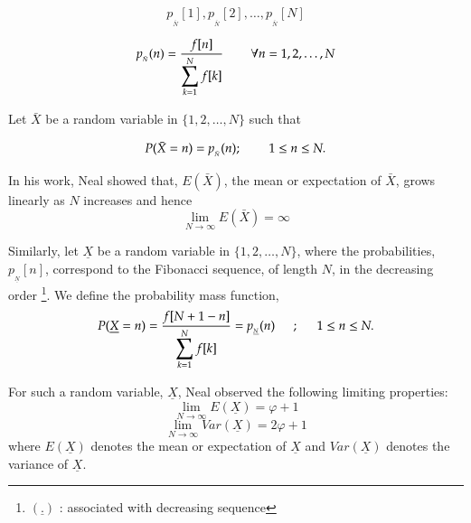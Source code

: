\begin{multicols}{2}
\vspace{-.6cm}

$$
p_{_{\bar{N}}}[1], p_{_{\bar{N}}}[2], \ldots, p_{_{\bar{N}}}[N]
$$

\vspace{-.2cm}

\begin{equation}
 p_{_{\bar{N}}}(n) = \frac{f[n]}{\displaystyle{\sum_{k =1}^N f[k]}} \hspace{0.3in} \forall n = 1, 2, \ldots, N \label{eq-2.3}
 \end{equation}

\vspace{-.2cm}

Let $\bar{X}$ be a random variable in $\{1,2, \ldots, N\}$ such that  

\vspace{-.2cm} 
 
\begin{equation}
P(\bar{X} = n) = p_{_{\bar{N}}}(n); \hspace{0.3in} 1 \leq n\leq N.\label{eq-2.4}
\end{equation}
 
\vspace{-.2cm} 
 
In his work, Neal \cite{art1-key01} showed that, $E(\bar{X})$, the mean or expectation of $\bar{X}$, grows linearly as $N$ increases and hence 
\begin{equation}
\lim_{N\rightarrow \infty} E(\bar{X}) = \infty\label{eq-2.5}
\end{equation} 

\vspace{-.4cm} 

Similarly, let $\underline{X}$ be a random variable in $\{1,2, \ldots, N\}$, where the probabilities, $p_{_{\underline{N}}}[n]$, correspond to the Fibonacci sequence, of length $N$, in the decreasing order \footnote{${(\underline{.})}$ : associated with decreasing sequence}. We define the probability mass function,
\begin{equation}
P(\underline{X} = n) = \frac{f[N+1-n]}{\displaystyle{\sum_{k =1}^N f[k]}} = p_{_{\underline{N}}}(n) \hspace{0.2in} ; \hspace{0.2in} 1 \leq n\leq N.\label{eq-2.6}
 \end{equation}

For such a random variable, $\underline{X}$, Neal \cite{neal} observed the following limiting properties:
\begin{equation}
\lim_{N\rightarrow \infty} E(\underline{X}) = \varphi + 1\label{eq-2.7}
\end{equation}
\begin{equation}
\lim_{N\rightarrow \infty} Var(\underline{X}) = 2\varphi + 1\label{eq-2.8}
\end{equation}
where $E(\underline{X})$ denotes the mean or expectation of $\underline{X}$ and $Var(\underline{X})$ denotes the variance of $\underline{X}$.


\end{multicols}

